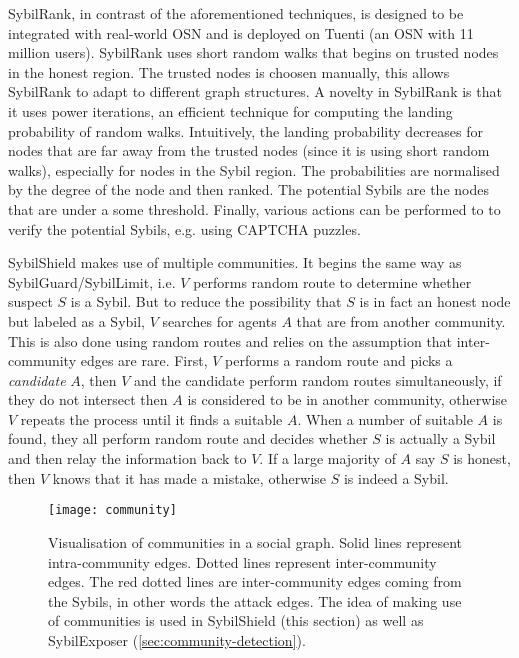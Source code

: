 
SybilRank, in contrast of the aforementioned techniques, is designed to be
integrated with real-world OSN and is deployed on Tuenti (an OSN with 11 million
users)\cite{cao2012aiding}. SybilRank uses short random walks that begins on
trusted nodes in the honest region. The trusted nodes is choosen manually, this
allows SybilRank to adapt to different graph structures. A novelty in SybilRank
is that it uses power iterations, an efficient technique for computing the
landing probability of random walks. Intuitively, the landing probability
decreases for nodes that are far away from the trusted nodes (since it is using
short random walks), especially for nodes in the Sybil region. The probabilities
are normalised by the degree of the node and then ranked. The potential Sybils
are the nodes that are under a some threshold. Finally, various actions can be
performed to to verify the potential Sybils, e.g. using CAPTCHA puzzles.

SybilShield\cite{shi2013sybilshield} makes use of multiple communities. It
begins the same way as SybilGuard/SybilLimit, i.e. $V$ performs random route to
determine whether suspect $S$ is a Sybil. But to reduce the possibility that $S$
is in fact an honest node but labeled as a Sybil, $V$ searches for agents $A$
that are from another community. This is also done using random routes and
relies on the assumption that inter-community edges are rare. First, $V$
performs a random route and picks a \emph{candidate} $A$, then $V$ and the
candidate perform random routes simultaneously, if they do not intersect then
$A$ is considered to be in another community, otherwise $V$ repeats the process
until it finds a suitable $A$. When a number of suitable $A$ is found, they all
perform random route and decides whether $S$ is actually a Sybil and then relay
the information back to $V$. If a large majority of $A$ say $S$ is honest, then
$V$ knows that it has made a mistake, otherwise $S$ is indeed a Sybil.

\begin{figure}
  \centering
  \texttt{[image: community]}
  \caption{Visualisation of communities in a social graph. Solid lines represent
    intra-community edges. Dotted lines represent inter-community edges. The red
    dotted lines are inter-community edges coming from the Sybils, in other
    words the attack edges. The idea of making use of communities is used in
    SybilShield (this section) as well as SybilExposer
    (\autoref{sec:community-detection}).}
  \label{fig:community}
\end{figure}


